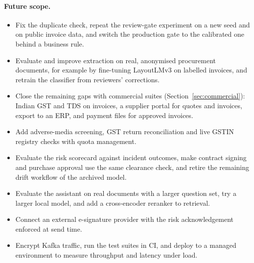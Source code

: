 \paragraph{Future scope.}
\begin{itemize}
  \item Fix the duplicate check, repeat the review-gate experiment on a new seed and on public invoice data, and switch the production gate to the calibrated one behind a business rule.
  \item Evaluate and improve extraction on real, anonymised procurement documents, for example by fine-tuning LayoutLMv3 on labelled invoices, and retrain the classifier from reviewers' corrections.
  \item Close the remaining gaps with commercial suites (Section~\ref{sec:commercial}): Indian GST and TDS on invoices, a supplier portal for quotes and invoices, export to an ERP, and payment files for approved invoices.
  \item Add adverse-media screening, GST return reconciliation and live GSTIN registry checks with quota management.
  \item Evaluate the risk scorecard against incident outcomes, make contract signing and purchase approval use the same clearance check, and retire the remaining drift workflow of the archived model.
  \item Evaluate the assistant on real documents with a larger question set, try a larger local model, and add a cross-encoder reranker to retrieval.
  \item Connect an external e-signature provider with the risk acknowledgement enforced at send time.
  \item Encrypt Kafka traffic, run the test suites in CI, and deploy to a managed environment to measure throughput and latency under load.
\end{itemize}
